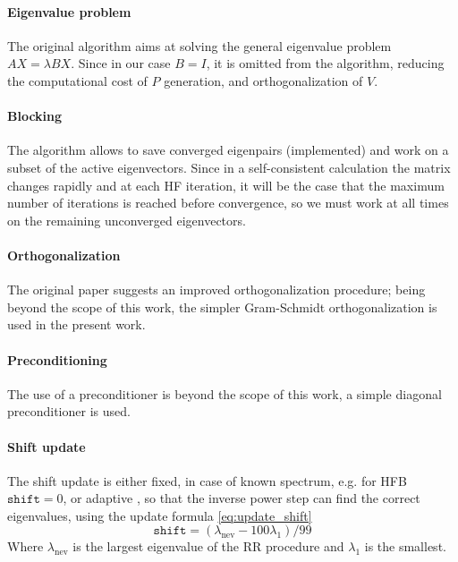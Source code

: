 \paragraph{Eigenvalue problem} The original algorithm aims at solving the general eigenvalue problem $AX = \lambda BX$. Since in our case $B=I$, it is omitted from the algorithm, reducing the computational cost of $P$ generation, and orthogonalization of $V$.
\paragraph{Blocking} The algorithm allows to save converged eigenpairs (implemented) and work on a subset of the active eigenvectors. Since in a self-consistent calculation the matrix changes rapidly and at each HF iteration, it will be the case that the maximum number of iterations is reached before convergence, so we must work at all times on the remaining unconverged eigenvectors.
\paragraph{Orthogonalization} The original paper \cite{GCG1} suggests an improved orthogonalization procedure; being beyond the scope of this work, the simpler Gram-Schmidt \cite{GM} orthogonalization is used in the present work.
\paragraph{Preconditioning} The use of a preconditioner is beyond the scope of this work, a simple diagonal preconditioner is used.
\paragraph{Shift update} The shift update is either fixed, in case of known spectrum, e.g. for HFB $\texttt{shift} = 0$, or adaptive \cite{GCG1}, so that the inverse power step can find the correct eigenvalues, using the update formula \ref{eq:update_shift}
\begin{equation}
    \label{eq:update_shift}
    \texttt{shift}=(\lambda_\text{nev} - 100\lambda_1)/99
\end{equation}
Where $\lambda_\text{nev}$ is the largest eigenvalue of the RR procedure and $\lambda_1$ is the smallest.
